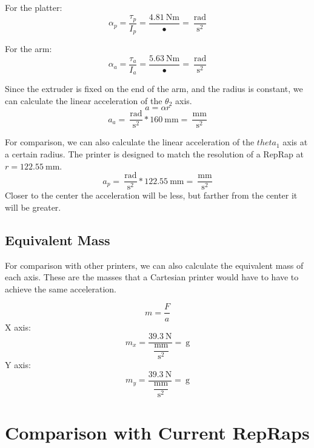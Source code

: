 \documentclass[12pt,letterpaper]{report}
\begin{document}
For the platter:
\begin{equation}
	\alpha_p = \dfrac{\tau_p}{I_p} = \dfrac{4.81~\mathrm{Nm}}{•} = ~\mathrm{\dfrac{rad}{s^2}}
\end{equation}

For the arm:
\begin{equation}
	\alpha_a = \dfrac{\tau_a}{I_a} = \dfrac{5.63~\mathrm{Nm}}{•} = ~\mathrm{\dfrac{rad}{s^2}}
\end{equation}

Since the extruder is fixed on the end of the arm, and the radius is constant, we can calculate the linear acceleration of the $\theta_2$ axis.
\begin{equation}
	a = \alpha r
\end{equation}
\begin{equation}
	a_a = ~\mathrm{\dfrac{rad}{s^2}} * 160~\mathrm{mm} = ~\mathrm{\dfrac{mm}{s^2}}
\end{equation}

For comparison, we can also calculate the linear acceleration of the $theta_1$ axis at a certain radius. The printer is designed to match the resolution of a RepRap at $r=122.55~\mathrm{mm}$.
\begin{equation}
	a_p = ~\mathrm{\dfrac{rad}{s^2}} * 122.55~\mathrm{mm} = ~\mathrm{\dfrac{mm}{s^2}}
\end{equation}
Closer to the center the acceleration will be less, but farther from the center it will be greater.

\subsection*{Equivalent Mass}
For comparison with other printers, we can also calculate the equivalent mass of each axis. These are the masses that a Cartesian printer would have to have to achieve the same acceleration.

\begin{equation}
	m = \dfrac{F}{a}
\end{equation}
X axis:
\begin{equation}
	m_x = \dfrac{39.3~\mathrm{N}}{~\mathrm{\dfrac{mm}{s^2}}} = ~\mathrm{g}
\end{equation}
Y axis:
\begin{equation}
	m_y = \dfrac{39.3~\mathrm{N}}{~\mathrm{\dfrac{mm}{s^2}}} = ~\mathrm{g}
\end{equation}

\section*{Comparison with Current RepRaps}
\end{document}
